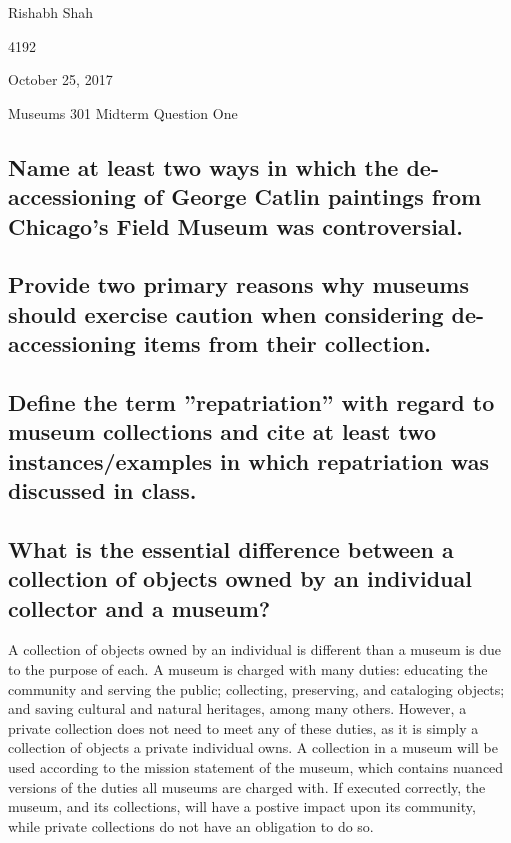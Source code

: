 \documentclass[11pt]{article}
\begin{document}
\begin{singlespacing}
{\Large\noindent Rishabh Shah

 4192

\noindent October 25, 2017

\noindent Museums 301 Midterm Question One}
\end{singlespacing}

\begin{singlespacing}
\subsection*{Name at least two ways in which the de-accessioning of George Catlin paintings from Chicago’s Field Museum was controversial.}
\end{singlespacing}

\begin{singlespacing}
\subsection*{Provide two primary reasons why museums should exercise caution when considering de-accessioning items from their collection.}
\end{singlespacing}

\begin{singlespacing}
\subsection*{Define the term ''repatriation'' with regard to museum collections and cite at least two instances/examples in which repatriation was discussed in class.}
\end{singlespacing}

\begin{singlespacing}
\subsection*{What is the essential difference between a collection of objects owned by an individual collector and a museum?}
\end{singlespacing}

A collection of objects owned by an individual is different than a museum is due to the purpose of each. A museum is charged with many duties: educating the community and serving the public; collecting, preserving, and cataloging objects; and saving cultural and natural heritages, among many others. However, a private collection does not need to meet any of these duties, as it is simply a collection of objects a private individual owns. A collection in a museum will be used according to the mission statement of the museum, which contains nuanced versions of the duties all museums are charged with. If executed correctly, the museum, and its collections, will have a postive impact upon its community, while private collections do not have an obligation to do so.
\end{document}

